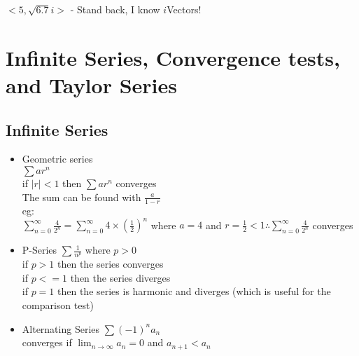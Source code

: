 \documentclass{article}
\begin{document}
\(<5,\sqrt{6.7}i>\) - Stand back, I know \(i\)Vectors!\\
\section*{\color{Gray}Infinite Series, Convergence tests, and Taylor
  Series}
  \subsection*{\color{BrickRed}Infinite Series}
  \begin{itemize}
    \item Geometric series\\
      \subitem \( \sum ar^n \) \\
      if \( |r|<1 \) then \( \sum ar^n \) converges\\
      The sum can be found with \(\frac{a}{1-r}\)\\
      \subitem eg:\\
      \( \sum\limits_{n=0}^{\infty} \frac {4} {2^n} =
      \sum\limits_{n=0}^{\infty} 4 \times (\frac {1} {2})^n \) where
      \(a=4\) and \(r=\frac {1} {2} < 1 \therefore \sum\limits_{n=0}^{\infty}
      \frac{4}{2^n} \) converges \\
    \item P-Series
      \subitem \( \sum \frac{1}{n^p}\) where
      \( p>0 \) \\
      if \(p>1\) then the series converges\\
      if \(p<=1\) then the series diverges\\
      if \(p=1\) then the series is harmonic and diverges (which is
      useful for the comparison test)\\
    \item Alternating Series
      \subitem \( \sum (-1)^n a_n \)\\
      converges if \( \lim_{n\rightarrow\infty} a_n=0 \) and \( a_{n+1}<a_n \)\\
  \end{itemize}
\end{document}
